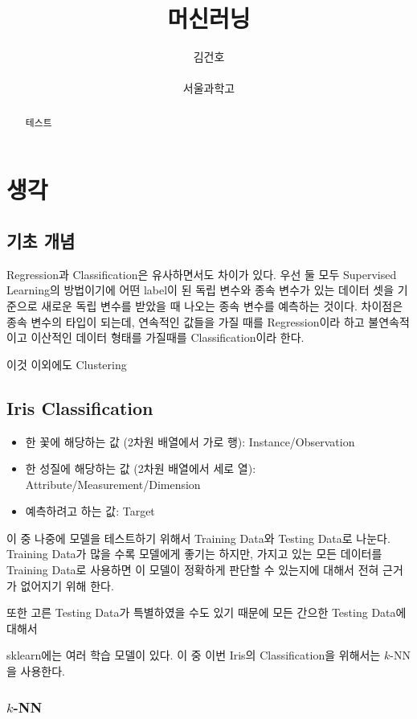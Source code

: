 \documentclass[]{sptr_article}
\title{\textbf{머신러닝}}
\author{김건호 \\ \phantom{m} \\ \normalsize 서울과학고} %
\date{}
\begin{document}
\maketitle

\begin{abstract}
테스트
\end{abstract}

\tableofcontents

\section{생각}

\subsection{기초 개념}

Regression과 Classification은 유사하면서도 차이가 있다.
우선 둘 모두 Supervised Learning의 방법이기에 어떤 label이 된 독립 변수와 종속 변수가 있는 데이터 셋을 기준으로
새로운 독립 변수를 받았을 때 나오는 종속 변수를 예측하는 것이다. 
차이점은 종속 변수의 타입이 되는데, 연속적인 값들을 가질 때를 Regression이라 하고 불연속적이고 이산적인 데이터 형태를 가질때를 Classification이라 한다.

이것 이외에도 Clustering%

\subsection{Iris Classification}

\begin{itemize}
    \item 한 꽃에 해당하는 값 (2차원 배열에서 가로 행): Instance/Observation
    \item 한 성질에 해당하는 값 (2차원 배열에서 세로 열): Attribute/Measurement/Dimension
    \item 예측하려고 하는 값: Target
\end{itemize}

이 중 나중에 모델을 테스트하기 위해서 Training Data와 Testing Data로 나눈다. 
Training Data가 많을 수록 모델에게 좋기는 하지만, 가지고 있는 모든 데이터를 Training Data로 사용하면 이 모델이 정확하게 판단할 수 있는지에 대해서 전혀 근거가 없어지기 위해 한다.

또한 고른 Testing Data가 특별하였을 수도 있기 때문에 모든 간으한 Testing Data에 대해서 

sklearn에는 여러 학습 모델이 있다. 이 중 이번 Iris의 Classification을 위해서는 $k$-NN을 사용한다. 


\subsubsection{$k$-NN}




\end{document}
